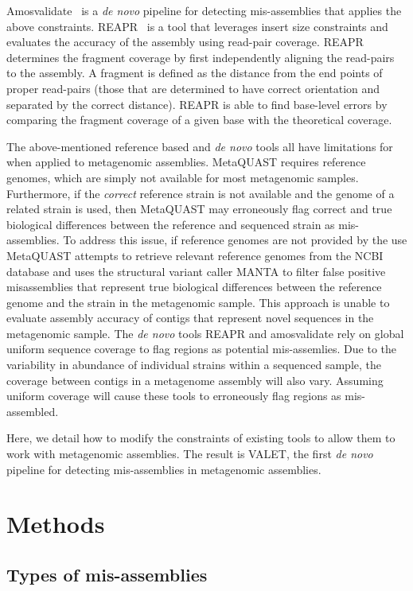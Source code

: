 \documentclass{bioinfo}
\begin{document}
Amosvalidate~\citep{amosvalidate2008} is a \emph{de novo} pipeline for detecting mis-assemblies that applies the above constraints. REAPR~\citep{hunt2013reapr} is a tool that leverages insert size constraints and evaluates the accuracy of the assembly using read-pair coverage.
REAPR determines the fragment coverage by first independently aligning the read-pairs to the assembly.
A fragment is defined as the distance from the end points of proper read-pairs (those that are determined to have correct orientation and separated by the correct distance).
REAPR is able to find base-level errors by comparing the fragment coverage of a given base with the theoretical coverage.

The above-mentioned reference based and \emph{de novo} tools all have limitations for when applied to metagenomic assemblies. 
MetaQUAST requires reference genomes, which are simply not available for most metagenomic samples. 
Furthermore, if the \emph{correct} reference strain is not available and the genome of a related strain is used, then MetaQUAST may erroneously flag correct and true biological differences between the reference and sequenced strain as mis-assemblies. 
To address this issue, if reference genomes are not provided by the use MetaQUAST attempts to retrieve relevant reference genomes from the NCBI database and uses the structural variant caller MANTA to filter false positive misassemblies that represent true biological differences between the reference genome and the strain in the metagenomic sample. This approach is unable to evaluate assembly accuracy of contigs that represent novel sequences in the metagenomic sample. 
The \emph{de novo} tools REAPR and amosvalidate rely on global uniform sequence coverage to flag regions as potential mis-assemlies.
Due to the variability in abundance of individual strains within a sequenced sample, the coverage between contigs in a metagenome assembly will also vary.
Assuming uniform coverage will cause these tools to erroneously flag regions as mis-assembled.

Here, we detail how to modify the constraints of existing tools to allow them to work with metagenomic assemblies.
The result is VALET, the first \emph{de novo} pipeline for detecting mis-assemblies in metagenomic assemblies.

\section{Methods}

\subsection{Types of mis-assemblies}
\end{document}
